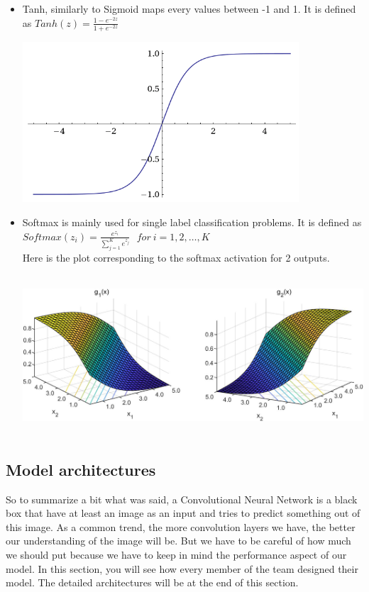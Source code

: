 \documentclass[12pt]{article}
\begin{document}
\begin{itemize}
\item Tanh, similarly to Sigmoid maps every values between -1 and 1. It is defined as $ Tanh(z) = \frac{1 - e^{-2z}}{1 + e^{-2z}}$ \\
\centerline{\includegraphics[height=6cm]{../../docs/tanh.png}}

\item Softmax is mainly used for single label classification problems. It is defined as $ Softmax(z_i) = \frac{e^{z_{i}}}{\sum_{j=1}^K e^{z_{j}}} \ \ \ for\ i=1,2,\dots,K$ \\
Here is the plot corresponding to the softmax activation for 2 outputs. \\
\centerline{\includegraphics[height=6cm]{../../docs/softmax.png}}

\end{itemize}

\subsection{Model architectures}

So to summarize a bit what was said, a Convolutional Neural Network is a black box that have at least an image as an input and tries to predict something out of this image. As a common trend, the more convolution layers we have, the better our understanding of the image will be. But we have to be careful of how much we should put because we have to keep in mind the performance aspect of our model. In this section, you will see how every member of the team designed their model. The detailed architectures will be at the end of this section. \\
\end{document}
